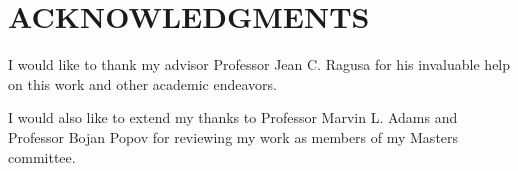 \chapter*{ACKNOWLEDGMENTS}
I would like to thank my advisor Professor Jean C. Ragusa for his invaluable help on this work and other academic endeavors. 
 
I would also like to extend my thanks to Professor Marvin L. Adams and Professor Bojan Popov for reviewing my work as members of my Masters committee.



\pagebreak{}
